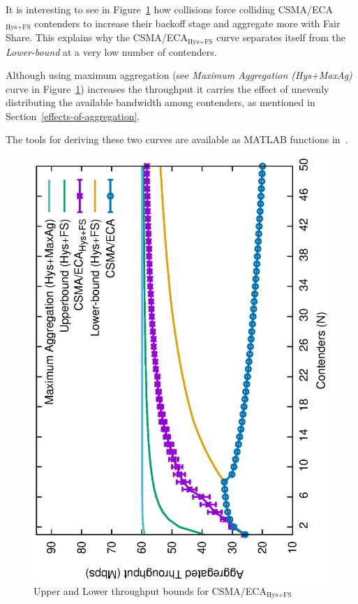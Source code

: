 \documentclass[a4paper,journal]{IEEEtran}
\providecommand{\DIFaddbeginFL}{} %
\providecommand{\DIFaddendFL}{} %
\providecommand{\DIFdelbeginFL}{} %
\providecommand{\DIFdelendFL}{} %
\begin{document}
	It is interesting to see in Figure~\ref{fig:ECA-bounds-comparison} how collisions force colliding CSMA/ECA$_{\text{Hys+FS}}$ contenders to increase their backoff stage and aggregate more with Fair Share. This explains why the CSMA/ECA$_{\text{Hys+FS}}$ curve separates itself from the \emph{Lower-bound} at a very low number of contenders. 

	Although using maximum aggregation (see \emph{Maximum Aggregation (Hys+MaxAg)} curve in Figure~\ref{fig:ECA-bounds-comparison}) increases the throughput it carries the effect of unevenly distributing the available bandwidth among contenders, as mentioned in Section~\ref{effects-of-aggregation}.

	The tools for deriving these two curves are available as MATLAB functions in~\cite{ECA-bounds-example}. 

	\begin{figure}[tb]
	\centering
		\DIFdelbeginFL %
\DIFdelendFL \DIFaddbeginFL \includegraphics[width=0.7\linewidth,angle=-90]{figures/throughput-w-model/throughput-combined-w-model-TON.eps}
		\DIFaddendFL \caption{Upper and Lower throughput bounds for CSMA/ECA$_{\text{Hys+FS}}$}
		\label{fig:ECA-bounds-comparison}
	\end{figure}
\end{document}
